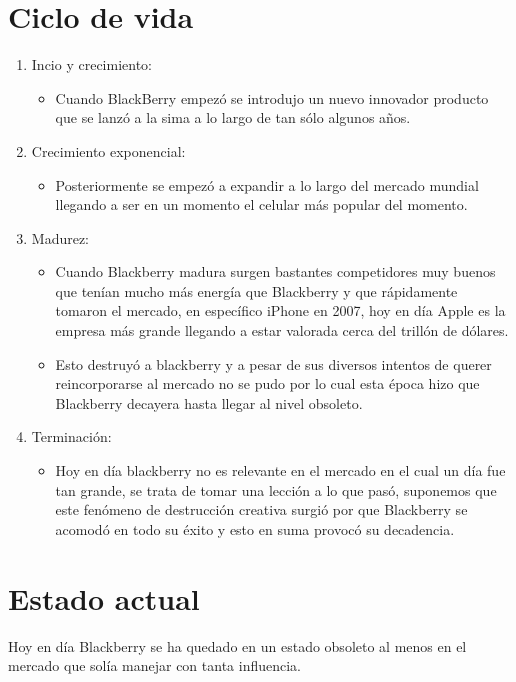 \documentclass{article}
\begin{document}
\section{Ciclo de vida}
\begin{enumerate}
    \item Incio y crecimiento:
        \begin{itemize}
            \item Cuando BlackBerry empezó se introdujo un nuevo innovador producto que se lanzó a la sima a lo largo de tan sólo algunos años.
        \end{itemize} 
    \item Crecimiento exponencial:
        \begin{itemize}
            \item Posteriormente se empezó a expandir a lo largo del mercado mundial llegando a ser en un momento el celular más popular del momento.
        \end{itemize}
    
    \item Madurez:
        \begin{itemize}
            \item Cuando Blackberry madura surgen bastantes competidores muy buenos que tenían mucho más energía que Blackberry y que rápidamente tomaron el mercado, en específico iPhone en 2007, hoy en día Apple es la empresa más grande llegando a estar valorada cerca del trillón de dólares.
            \item Esto destruyó a blackberry y a pesar de sus diversos intentos de querer reincorporarse al mercado no se pudo por lo cual esta época hizo que Blackberry decayera hasta llegar al nivel obsoleto.
        \end{itemize}
    
    \item Terminación: 
        \begin{itemize}
            \item Hoy en día blackberry no es relevante en el mercado en el cual un día fue tan grande, se trata de tomar una lección a lo que pasó, suponemos que este fenómeno de destrucción creativa surgió por que Blackberry se acomodó en todo su éxito y esto en suma provocó su decadencia.
        \end{itemize}
\end{enumerate}

\section{Estado actual}
Hoy en día Blackberry se ha quedado en un estado obsoleto al menos en el mercado que solía manejar con tanta influencia.
\end{document}
